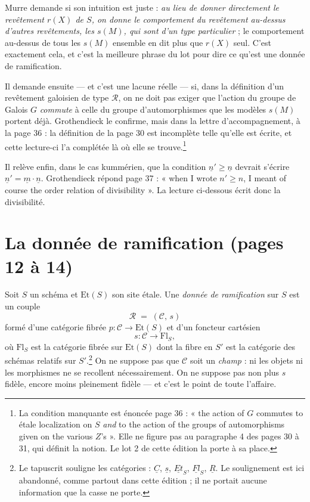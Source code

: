 \documentclass[11pt,a4paper]{article}
\begin{document}
Murre demande si son intuition est juste : \emph{au lieu de donner directement
le revêtement $r(X)$ de $S$, on donne le comportement du revêtement au-dessus
d'autres revêtements, les $s(M)$, qui sont d'un type particulier} ; le
comportement au-dessus de tous les $s(M)$ ensemble en dit plus que $r(X)$
seul. C'est exactement cela, et c'est la meilleure phrase du lot pour dire ce
qu'est une donnée de ramification.

Il demande ensuite --- et c'est une lacune réelle --- si, dans la définition
d'un revêtement galoisien de type $\mathcal{R}$, on ne doit pas exiger que
l'action du groupe de Galois $G$ \emph{commute} à celle du groupe
d'automorphismes que les modèles $s(M)$ portent déjà. Grothendieck le confirme,
mais dans la lettre d'accompagnement, à la page 36 : la définition de la page
30 est incomplète telle qu'elle est écrite, et cette lecture-ci l'a complétée
là où elle se trouve.\footnote{La condition manquante est énoncée page 36 :
« the action of $G$ commutes to étale localization on $S$ \emph{and} to the
action of the groups of automorphisms given on the various $Z$'s ». Elle ne
figure pas au paragraphe 4 des pages 30 à 31, qui définit la notion. Le lot 2
de cette édition la porte à sa place.}

Il relève enfin, dans le cas kummérien, que la condition
$\underline{n}' \geqslant \underline{n}$ devrait s'écrire
$\underline{n}' = \underline{m} \cdot \underline{n}$. Grothendieck répond page
37 : « when I wrote $n' \geqslant n$, I meant of course the order relation of
divisibility ». La lecture ci-dessous écrit donc la divisibilité.

\section*{La donnée de ramification (pages 12 à 14)}

Soit $S$ un schéma et $\mathrm{Et}(S)$ son site étale. Une \emph{donnée de
ramification} sur $S$ est un couple
\[
  \mathcal{R} \;=\; (\mathcal{C},\, s)
\]
formé d'une catégorie fibrée $p : \mathcal{C} \to \mathrm{Et}(S)$ et d'un
foncteur cartésien
\[
  s : \mathcal{C} \longrightarrow \mathrm{Fl}_{S} ,
\]
où $\mathrm{Fl}_{S}$ est la catégorie fibrée sur $\mathrm{Et}(S)$ dont la fibre
en $S'$ est la catégorie des schémas relatifs sur $S'$.\footnote{Le tapuscrit
souligne les catégories : $\underline{C}$, $\underline{s}$, $\underline{Et}_S$,
$\underline{Fl}_S$, $\underline{R}$. Le soulignement est ici abandonné, comme
partout dans cette édition ; il ne portait aucune information que la casse ne
porte.} On ne suppose pas que $\mathcal{C}$ soit un \emph{champ} : ni les
objets ni les morphismes ne se recollent nécessairement. On ne suppose pas non
plus $s$ fidèle, encore moins pleinement fidèle --- et c'est le point de toute
l'affaire.
\end{document}
